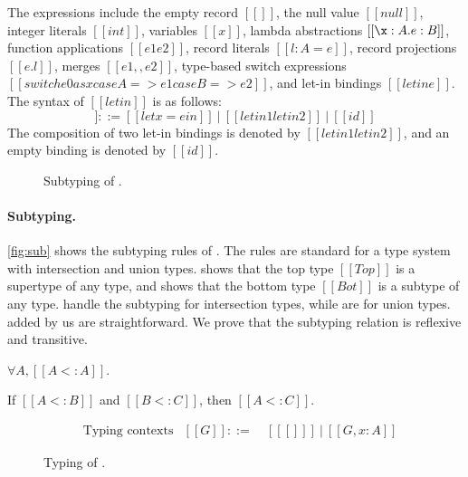 The expressions include the empty record $[[{}]]$, the null value $[[null]]$,
integer literals $[[int]]$, variables $[[x]]$, lambda abstractions $[[\x:A. e:B]]$,
function applications $[[e1 e2]]$, record literals $[[{l : A = e}]]$, record
projections $[[e.l]]$, merges $[[e1 ,, e2]]$, type-based switch expressions
$[[switch e0 as x case A => e1 case B => e2]]$, and let-in bindings $[[letin e]]$.
The syntax of $[[letin]]$ is as follows:
\begin{equation*}
  [[letin]] ::= [[let x = e in]] ~|~ [[letin1 letin2]] ~|~ [[id]]
\end{equation*}
The composition of two let-in bindings is denoted by $[[letin1 letin2]]$, and an
empty binding is denoted by $[[id]]$.

\begin{figure}
\IUdefnsub{}
\caption{Subtyping of \lambdaiu.} \label{fig:sub}
\end{figure}

\paragraph{Subtyping.}
\autoref{fig:sub} shows the subtyping rules of \lambdaiu. The rules are standard
for a type system with intersection and union types.  shows that
the top type $[[Top]]$ is a supertype of any type, and  shows that
the bottom type $[[Bot]]$ is a subtype of any type.
 handle the subtyping for intersection types,
while  are for union types. 
added by us are straightforward. We prove that the subtyping relation is
reflexive and transitive.

\begin{theorem}
  $\forall A, [[A <: A]]$.
\end{theorem}
\begin{theorem}
  If $[[A <: B]]$ and $[[B <: C]]$, then $[[A <: C]]$.
\end{theorem}

\begin{figure}
\begin{align*}
  &\text{Typing contexts}&[[G]] ::=&~ [[ [] ]] ~|~ [[G, x : A]]
\end{align*}
\IUdefntyping{}
\IUdefnletbind{}
\caption{Typing of \lambdaiu.} \label{fig:typ}
\end{figure}

